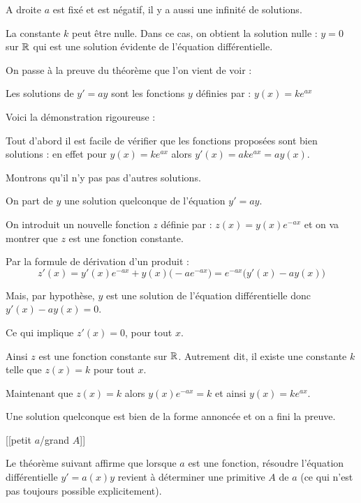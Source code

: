A droite $a$ est fixé et est négatif, 
il y a aussi une infinité de solutions.


La constante $k$ peut être nulle. Dans ce cas, on obtient 
  la \og solution nulle \fg : $y = 0$ sur $\mathbb{R}$ qui est une solution
  évidente de l'équation différentielle.

\diapo


On passe à la preuve du théorème que l'on vient de voir :

Les solutions de $y' = a y$ sont les fonctions $y$ définies par :
$y(x) = k e^{ax}$

Voici la démonstration rigoureuse :
  
\change
Tout d'abord  il est facile de vérifier que les fonctions 
proposées sont bien solutions : 
en effet pour $y(x) = k e^{ax}$ alors 
  $y'(x) = ake^{ax} = a y(x).$
  
\change
Montrons qu'il n'y pas pas d'autres solutions. 

\change
On part de $y$ une solution quelconque de l'équation $y' = a y$.

\change
On introduit un nouvelle fonction $z$ définie par : 
$z(x) = y(x) e^{-ax}$ et on va montrer que $z$ est une fonction constante.

\change
Par la formule de dérivation d'un produit :
  $$z'(x) = y'(x)e^{-ax} +  y(x)\big(-ae^{-ax}\big) =  e^{-ax}\big(y'(x)-ay(x)\big)$$
  
\change
  Mais, par hypothèse, $y$ est une solution de l'équation différentielle
  donc $y'(x) - ay(x) = 0$. 
  
  Ce qui implique $z'(x) = 0$, pour tout $x$.
  
  \change
  Ainsi $z$ est une fonction constante sur $\mathbb{R}$.
  Autrement dit, il existe une constante $k$ telle que 
  $z(x)=k$ pour tout $x$.
  
  \change
  Maintenant que $z(x)= k$ alors $y(x) e^{-ax} = k$
  et ainsi $y(x) = ke^{ax}.$
  
  Une solution quelconque est bien de la forme annoncée
  et on a fini la preuve.

\diapo

[[petit $a$/grand $A$]]

Le théorème suivant affirme que lorsque $a$ est une fonction,
résoudre l'équation différentielle $y'=a(x)y$ 
revient à déterminer une primitive $A$ de $a$ 
(ce qui n'est pas toujours possible explicitement).


